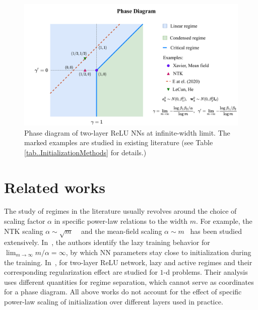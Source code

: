 \documentclass[twoside,11pt]{article}
\begin{document}
\begin{figure}
    \centering
    \includegraphics[width=\textwidth]{pic/fig-phase-diagram}
    \caption{Phase diagram of two-layer ReLU NNs at infinite-width limit. The marked examples are studied in existing literature (see Table \ref{tab..InitializationMethods} for details.) }
    \label{fig:phase-diagram}
\end{figure}

\section{Related works}
The study of regimes in the literature usually revolves around the choice of scaling factor $\alpha$ in specific power-law relations to the width $m$. For example, the NTK scaling $\alpha\sim\sqrt{m}$ ~\cite{jacot_neural_2018,arora2019exact,zhang_type_2019} and the mean-field scaling $\alpha\sim m$~\cite{mei_mean_2018,rotskoff_parameters_2018,chizat_global_2018,sirignano_mean_2020} has been studied extensively. In~\cite{chizat2019lazy}, the authors identify the lazy training behavior for $\lim_{m\to \infty}m/\alpha =\infty$, by which NN parameters stay close to initialization during the training. In~\cite{williams_gradient_2019}, for two-layer ReLU network, lazy and active regimes and their corresponding regularization effect are studied for $1$-d problems. Their analysis uses different quantities for regime separation, which cannot serve as coordinates for a phase diagram. All above works do not account for the effect of specific power-law scaling of initialization over different layers used in practice.
\end{document}

